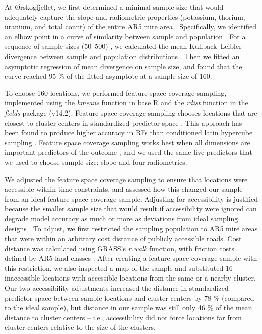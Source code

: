 \documentclass[soil, manuscript]{copernicus}
\begin{document}
At Ørskogfjellet, we first determined a minimal sample size that would adequately capture the slope and radiometric properties (potassium, thorium, uranium, and total count) of the entire AR5 mire area \citep{sauretteDivergenceMetricsDetermining2023}.
Specifically, we identified an elbow point in a curve of similarity between sample and population \citep{maloneMethodsImproveUtility2019}.
For a sequence of sample sizes (50--500) \citep[ten replicates each, drawn by conditioned latin hypercube sampling,][]{minasnyConditionedLatinHypercube2006, roudierClhsPackageConditioned2011}, we calculated the mean Kullback--Leibler divergence between sample and population distributions \citep{maloneMethodsImproveUtility2019, sauretteDivergenceMetricsDetermining2023}.
Then we fitted an asymptotic regression of mean divergence on sample size, and found that the curve reached 95 \% of the fitted asymptote at a sample size of 160.

To choose 160 locations, we performed feature space coverage sampling, implemented using the \emph{kmeans} function in base R and the \emph{rdist} function in the \emph{fields} package (v14.2).
Feature space coverage sampling chooses locations that are closest to cluster centers in standardized predictor space \citep{brusSamplingDigitalSoil2019}.
This approach has been found to produce higher accuracy in RFs than conditioned latin hypercube sampling \citep{wadouxSamplingDesignOptimization2019, maComparisonConditionedLatin2020}.
Feature space coverage sampling works best when all dimensions are important predictors of the outcome \citep{wadouxSamplingDesignOptimization2019}, and we used the same five predictors that we used to choose sample size: slope and four radiometrics.

We adjusted the feature space coverage sampling to ensure that locations were accessible within time constraints, and assessed how this changed our sample from an ideal feature space coverage sample.
Adjusting for accessibility is justified because the smaller sample size that would result if accessibility were ignored can degrade model accuracy as much or more as deviations from ideal sampling designs \citep{wadouxSamplingDesignOptimization2019, maComparisonConditionedLatin2020}.
To adjust, we first restricted the sampling population to AR5 mire areas that were within an arbitrary cost distance of publicly accessible roads.
Cost distance was calculated using GRASS's \emph{r.walk} function, with friction costs defined by AR5 land classes \citep{GRASSv8-2}.
After creating a feature space coverage sample with this restriction, we also inspected a map of the sample and substituted 16 inaccessible locations with accessible locations from the same or a nearby cluster.
Our two accessibility adjustments increased the distance in standardized predictor space between sample locations and cluster centers by 78 \% (compared to the ideal sample), but distance in our sample was still only 46 \% of the mean distance to cluster centers -- i.e., accessibility did not force locations far from cluster centers relative to the size of the clusters.
\end{document}
